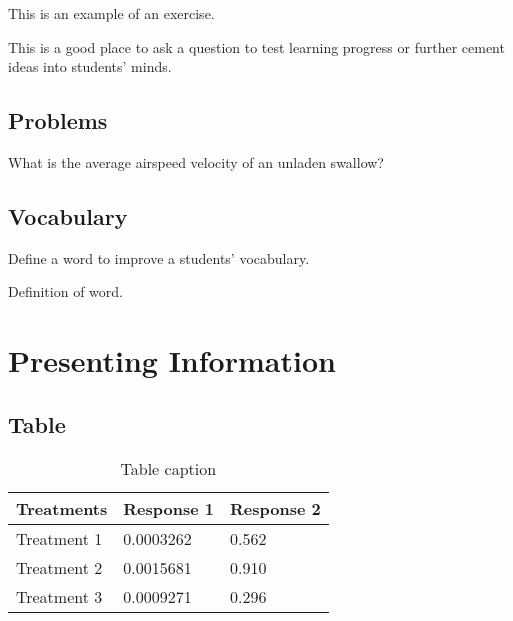 \documentclass[11pt,fleqn,oneside,openany]{book} %
\begin{document}
This is an example of an exercise.

\begin{exercise}
This is a good place to ask a question to test learning progress or further cement ideas into students' minds.
\end{exercise}


\section{Problems}

\begin{problem}
What is the average airspeed velocity of an unladen swallow?
\end{problem}


\section{Vocabulary}

Define a word to improve a students' vocabulary.

\begin{vocabulary}[Word]
Definition of word.
\end{vocabulary}



\chapter{Presenting Information}

\section{Table}

\begin{table}[h]
\centering
\begin{tabular}{l l l}
\toprule
\textbf{Treatments} & \textbf{Response 1} & \textbf{Response 2}\\
\midrule
Treatment 1 & 0.0003262 & 0.562 \\
Treatment 2 & 0.0015681 & 0.910 \\
Treatment 3 & 0.0009271 & 0.296 \\
\bottomrule
\end{tabular}
\caption{Table caption}
\end{table}
\end{document}
